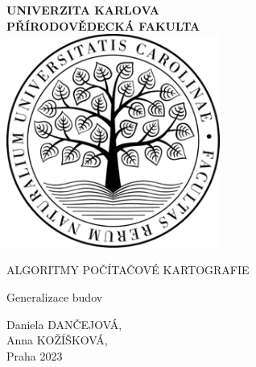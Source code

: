 \documentclass[11pt, a4paper]{report}
\begin{document}
\begin{titlepage}
    \centering
        {\bfseries\Large
            UNIVERZITA KARLOVA\\
            PŘÍRODOVĚDECKÁ FAKULTA\\
            \vskip2cm
        } 
        \vfill
             \includegraphics[width=7cm]{logo_natur} %
        \vfill
        {\bfseries\Large
            \vskip2cm
            {\Large ALGORITMY POČÍTAČOVÉ KARTOGRAFIE\par}
            \vskip0.3cm
            Generalizace budov\\
            \vskip4.5cm
        }
\vfill
    {\large\raggedleft Daniela DANČEJOVÁ, \\Anna KOŽÍŠKOVÁ, \\Praha 2023\par} 
\vfill
\vfill
\end{titlepage}







\end{document}
